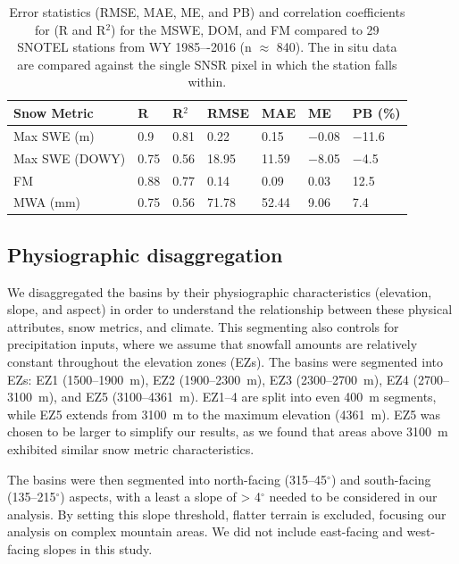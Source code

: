 \begin{table}[htbp]
  \centering
  \caption{Error statistics (RMSE, MAE, ME, and PB) and correlation coefficients for (R and R$^{2}$) for the MSWE, DOM, and FM compared to 29 SNOTEL stations from WY 1985–-2016 (n $\approx$ 840). The in situ data are compared against the single SNSR pixel in which the station falls within.}
  \label{tab:snow_metrics_val_table}
  \begin{tabular}{lllllll}
    \toprule
    Snow Metric & R & R$^{2}$ & RMSE & MAE & ME & PB (\%) \\
    \midrule
    Max SWE (m) & 0.9 & 0.81 & 0.22 & 0.15 & $-$0.08 & $-$11.6 \\
    Max SWE (DOWY) & 0.75 & 0.56 & 18.95 & 11.59 & $-$8.05 & $-$4.5 \\
    FM & 0.88 & 0.77 & 0.14 & 0.09 & 0.03 & 12.5 \\
    MWA (mm) & 0.75 & 0.56 & 71.78 & 52.44 & 9.06 & 7.4 \\
    \bottomrule
  \end{tabular}
\end{table}

\hypertarget{ch2-methods-2}{\subsection{Physiographic disaggregation}\label{ch2-methods-2}}

We disaggregated the basins by their physiographic characteristics (elevation, slope, and aspect) in order to understand the relationship between these physical attributes, snow metrics, and climate. This segmenting also controls for precipitation inputs, where we assume that snowfall amounts are relatively constant throughout the elevation zones (EZs). The basins were segmented into EZs: EZ1 (1500--1900~m), EZ2 (1900--2300~m), EZ3 (2300--2700~m), EZ4 (2700--3100~m), and EZ5 (3100--4361~m). EZ1--4 are split into even 400~m segments, while EZ5 extends from 3100~m to the maximum elevation (4361~m). EZ5 was chosen to be larger to simplify our results, as we found that areas above 3100~m exhibited similar snow metric characteristics. 

The basins were then segmented into north-facing (315--45$^{\circ}$) and south-facing (135--215$^{\circ}$) aspects, with a least a slope of > 4$^{\circ}$ needed to be considered in our analysis. By setting this slope threshold, flatter terrain is excluded, focusing our analysis on complex mountain areas. We did not include east-facing and west-facing slopes in this study. 

